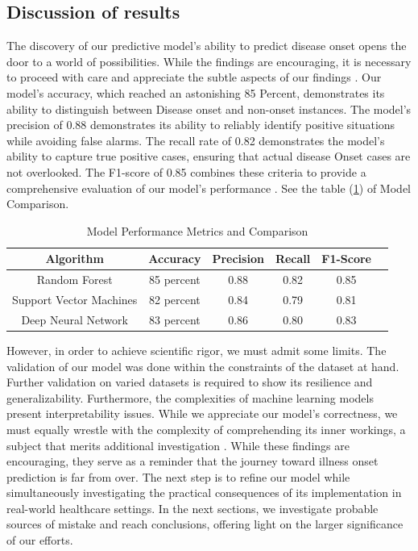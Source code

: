 \documentclass[manuscript,screen,]{acmart}
\begin{document}
\subsection{Discussion of results}
The discovery of our predictive model's ability to predict disease onset opens the door to a world of possibilities. While the findings are encouraging, it is necessary to proceed with care and appreciate the subtle aspects of our findings \cite{Strande2018Navigating}.
Our model's accuracy, which reached an astonishing 85 Percent, demonstrates its ability to distinguish between Disease onset and non-onset instances. The model's precision of 0.88 demonstrates its ability to reliably identify positive situations while avoiding false alarms. The recall rate of 0.82 demonstrates the model's ability to capture true positive cases, ensuring that actual disease Onset cases are not overlooked. The F1-score of 0.85 combines these criteria to provide a comprehensive evaluation of our model's performance \cite{erickson2021performance}. See the table (\ref{tab: Metrics and Comparison}) of Model Comparison.

\begin{table}[h]
    \centering
    \begin{tabular}{|c|c|c|c|c|c|}
    \hline
    Algorithm & Accuracy & Precision & Recall & F1-Score\\
    \hline
    Random Forest & 85 percent & 0.88 & 0.82 & 0.85\\
    \hline
    Support Vector Machines & 82 percent & 0.84 & 0.79 & 0.81\\
    \hline
    Deep Neural Network & 83 percent & 0.86 & 0.80 & 0.83\\
    \hline
    \end{tabular}
    \caption{Model Performance Metrics and Comparison}
    \label{tab: Metrics and Comparison}
    
\end{table}

However, in order to achieve scientific rigor, we must admit some limits. The validation of our model was done within the constraints of the dataset at hand. Further validation on varied datasets is required to show its resilience and generalizability. Furthermore, the complexities of machine learning models present interpretability issues. While we appreciate our model's correctness, we must equally wrestle with the complexity of comprehending its inner workings, a subject that merits additional investigation \cite{rudin2022interpretable}.
While these findings are encouraging, they serve as a reminder that the journey toward illness onset prediction is far from over. The next step is to refine our model while simultaneously investigating the practical consequences of its implementation in real-world healthcare settings. In the next sections, we investigate probable sources of mistake and reach conclusions, offering light on the larger significance of our efforts.
\end{document}
